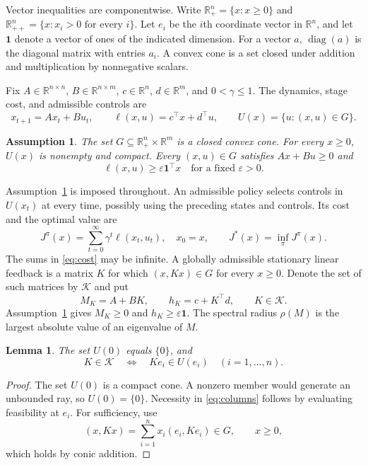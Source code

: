 \documentclass[10pt]{article}
\newtheorem{assumption}{Assumption}
\newtheorem{lemma}{Lemma}
\newcommand{\R}{\mathbb R}
\newcommand{\one}{\mathbf 1}
\DeclareMathOperator{\diag}{diag}
\begin{document}
Vector inequalities are componentwise. Write $\R_+^n=\{x:x\ge0\}$ and $\R_{++}^n=\{x:x_i>0\text{ for every }i\}$. Let $e_i$ be the $i$th coordinate vector in $\R^n$, and let $\one$ denote a vector of ones of the indicated dimension. For a vector $a$, $\diag(a)$ is the diagonal matrix with entries $a_i$. A convex cone is a set closed under addition and multiplication by nonnegative scalars.

Fix $A\in\R^{n\times n}$, $B\in\R^{n\times m}$, $c\in\R^n$, $d\in\R^m$, and $0<\gamma\le1$. The dynamics, stage cost, and admissible controls are
\begin{equation}
 x_{t+1}=Ax_t+Bu_t,\qquad
 \ell(x,u)=c^\top x+d^\top u,\qquad
 U(x)=\{u:(x,u)\in G\}.
 \label{eq:problem}
\end{equation}

\begin{assumption}
\label{ass:data}
The set $G\subseteq\R_+^n\times\R^m$ is a closed convex cone. For every $x\ge0$, $U(x)$ is nonempty and compact. Every $(x,u)\in G$ satisfies $Ax+Bu\ge0$ and
\begin{equation}
 \ell(x,u)\ge\varepsilon\one^\top x
 \quad\text{for a fixed }\varepsilon>0.
 \label{eq:positive-cost}
\end{equation}
\end{assumption}

Assumption~\ref{ass:data} is imposed throughout. An admissible policy selects controls in $U(x_t)$ at every time, possibly using the preceding states and controls. Its cost and the optimal value are
\begin{equation}
 J^\pi(x)=\sum_{t=0}^{\infty}\gamma^t\ell(x_t,u_t),
 \quad x_0=x,\qquad
 J^*(x)=\inf_\pi J^\pi(x).
 \label{eq:cost}
\end{equation}
The sums in \eqref{eq:cost} may be infinite. A globally admissible stationary linear feedback is a matrix $K$ for which $(x,Kx)\in G$ for every $x\ge0$. Denote the set of such matrices by $\mathcal K$ and put
\begin{equation}
 M_K=A+BK,\qquad h_K=c+K^\top d,\qquad K\in\mathcal K.
 \label{eq:closed-loop}
\end{equation}
Assumption~\ref{ass:data} gives $M_K\ge0$ and $h_K\ge\varepsilon\one$. The spectral radius $\rho(M)$ is the largest absolute value of an eigenvalue of $M$.

\begin{lemma}
\label{lem:geometry}
The set $U(0)$ equals $\{0\}$, and
\begin{equation}
 K\in\mathcal K\quad\Longleftrightarrow\quad Ke_i\in U(e_i)
 \quad (i=1,\ldots,n).
 \label{eq:columns}
\end{equation}
\end{lemma}
\begin{proof}
The set $U(0)$ is a compact cone. A nonzero member would generate an unbounded ray, so $U(0)=\{0\}$. Necessity in \eqref{eq:columns} follows by evaluating feasibility at $e_i$. For sufficiency, use
\[
 (x,Kx)=\sum_{i=1}^n x_i(e_i,Ke_i)\in G,
 \qquad x\ge0,
\]
which holds by conic addition.
\end{proof}
\end{document}
